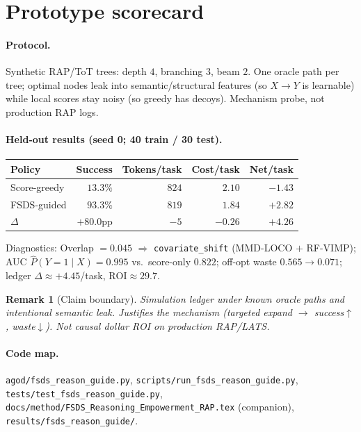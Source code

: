 \documentclass[11pt]{article}
\newtheorem{remark}{Remark}
\newcommand{\ROI}{\mathrm{ROI}}
\newcommand{\Phat}{\widehat{P}}
\begin{document}
\section{Prototype scorecard}
\label{sec:score}

\paragraph{Protocol.}
Synthetic RAP/ToT trees: depth $4$, branching $3$, beam $2$.
One oracle path per tree; optimal nodes leak into semantic/structural
features (so $X\!\to\!Y$ is learnable) while local scores stay noisy
(so greedy has decoys). Mechanism probe, not production RAP logs.

\paragraph{Held-out results (seed 0; 40 train / 30 test).}
\begin{center}
\begin{tabular}{@{}lrrrr@{}}
\toprule
Policy & Success & Tokens/task & Cost/task & Net/task \\
\midrule
Score-greedy & $13.3\%$ & $824$ & $2.10$ & $-1.43$ \\
FSDS-guided  & $\mathbf{93.3\%}$ & $819$ & $1.84$ & $\mathbf{+2.82}$ \\
$\Delta$ & $\mathbf{+80.0}$pp & $-5$ & $-0.26$ & $\mathbf{+4.26}$ \\
\bottomrule
\end{tabular}
\end{center}

\vspace{0.4em}
\noindent
Diagnostics: Overlap $=0.045$ $\Rightarrow$ \texttt{covariate\_shift}
(MMD-LOCO $+$ RF-VIMP);
AUC $\Phat(Y{=}1\mid X)=0.995$ vs.\ score-only $0.822$;
off-opt waste $0.565\to 0.071$;
ledger $\Delta\approx{+}4.45$/task, $\ROI\approx 29.7$.

\begin{remark}[Claim boundary]
Simulation ledger under known oracle paths and intentional semantic leak.
Justifies the mechanism (targeted expand $\to$ success$\uparrow$,
waste$\downarrow$). Not causal dollar ROI on production RAP/LATS.
\end{remark}

\paragraph{Code map.}
\texttt{agod/fsds\_reason\_guide.py},
\texttt{scripts/run\_fsds\_reason\_guide.py},
\texttt{tests/test\_fsds\_reason\_guide.py},
\texttt{docs/method/FSDS\_Reasoning\_Empowerment\_RAP.tex}
(companion),
\texttt{results/fsds\_reason\_guide/}.
\end{document}
